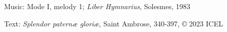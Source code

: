




\begin{hymnsource}
Music: Mode I, melody 1; \emph{Liber Hymnarius}, Solesmes, 1983

Text: \emph{Splendor paternæ gloriæ}, Saint Ambrose, 340-397, © 2023 ICEL
\end{hymnsource}
